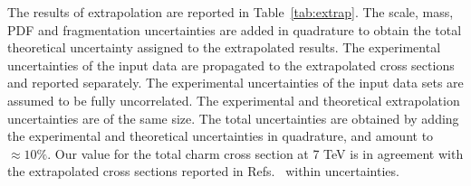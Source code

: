 \documentclass[12pt,a4paper]{article}
\begin{document}
The results of extrapolation are reported in Table~\ref{tab:extrap}. The scale, mass, PDF and fragmentation uncertainties are added in quadrature to obtain the total theoretical uncertainty assigned to the extrapolated results. The experimental uncertainties of the input data are propagated to the extrapolated cross sections and reported separately. The experimental uncertainties of the input data sets are assumed to be fully uncorrelated. %
The experimental and theoretical extrapolation uncertainties are of the same size. The total uncertainties are obtained by adding the experimental and theoretical uncertainties in quadrature, and amount to $\approx 10\%$.
Our value for the total charm cross section at 7 TeV is in agreement with the extrapolated cross sections reported in Refs.~\cite{Aad:2015zix,Acharya:2019mgn,Bhattacharya:2015jpa} within uncertainties.
\end{document}
